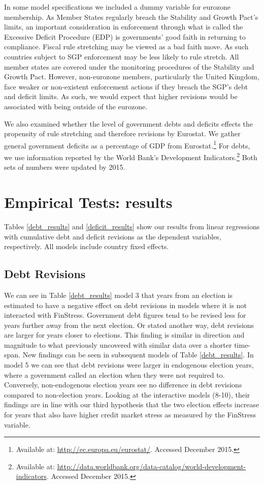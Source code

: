 \documentclass[]{article}
\begin{document}
In some model specifications we included a dummy variable for eurozone membership. As Member States regularly breach the Stability and Growth Pact's limits, an important consideration in enforcement through what is called the Excessive Deficit Procedure (EDP) is governments' good faith in returning to compliance. Fiscal rule stretching may be viewed as a bad faith move. As such countries subject to SGP enforcement may be less likely to rule stretch. All member states are covered under the monitoring procedures of the Stability and Growth Pact. However, non-eurozone members, particularly the United Kingdom, face weaker or non-existent enforcement actions if they breach the SGP's debt and deficit limits. As such, we would expect that higher revisions would be associated with being outside of the eurozone.

We also examined whether the level of government debts and deficits effects the propensity of rule stretching and therefore revisions by Eurostat. We gather general government deficits as a percentage of GDP from Eurostat.\footnote{Available at: \url{http://ec.europa.eu/eurostat/}. Accessed December 2015.} For debts, we use information reported by the World Bank's Development Indicators.\footnote{Available at: \url{http://data.worldbank.org/data-catalog/world-development-indicators}. Accessed December 2015.} Both sets of numbers were updated by 2015.

\section{Empirical Tests: results}

Tables \ref{debt_results} and \ref{deficit_results} show our results from linear regressions with cumulative debt and deficit revisions as the dependent variables, respectively. All models include country fixed effects.

\subsection{Debt Revisions}

We can see in Table \ref{debt_results} model 3 that years from an election is estimated to have a negative effect on debt revisions in models where it is not interacted with FinStress. Government debt figures tend to be revised less for years further away from the next election. Or stated another way, debt revisions are larger for years closer to elections. This finding is similar in direction and magnitude to what \cite{DeCastro2013} previously uncovered with similar data over a shorter time-span. New findings can be seen in subsequent models of Table \ref{debt_results}. In model 5 we can see that debt revisions were larger in endogenous election years, where a government called an election when they were not required to. Conversely, non-endogenous election years see no difference in debt revisions compared to non-election years. Looking at the interactive models (8-10), their findings are in line with our third hypothesis that the two election effects increase for years that also have higher credit market stress as measured by the FinStress variable.
\end{document}
